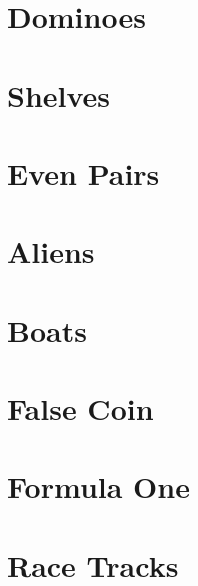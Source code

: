 \documentclass[a4paper, 10pt]{article}
\let\stdsection\section
\renewcommand\section{\newpage\stdsection}
\newcommand{\includecode}[1]{
    }
\newcommand{\algoAuthor}{2} %
\begin{document}
    \section{Dominoes}
        \label{sec:dominoes}
        \includecode{../problems/w01/Dominoes/Dominoes\algoAuthor.cpp}
    
    \section{Shelves}
        \label{sec:shelves}
        \includecode{../problems/w01/Shelves/Shelves\algoAuthor.cpp}
        
    \section{Even Pairs}
        \label{sec:even_pairs}
        \includecode{../problems/w01/Shelves/Shelves\algoAuthor.cpp}
    
    
    \section{Aliens}
        \label{sec:aliens}
        \includecode{../problems/w02/Aliens/Aliens\algoAuthor.cpp}
        
    \section{Boats}
        \label{sec:boats}
        \includecode{../problems/w02/Boats/Boats\algoAuthor.cpp}
        
    \section{False Coin}
        \label{sec:false_coin}
        \includecode{../problems/w02/False_Coin/FalseCoin\algoAuthor.cpp}
        
    \section{Formula One}
        \label{sec:formula_one}
        \includecode{../problems/w02/Formulas/Formulas\algoAuthor.cpp}
        
    \section{Race Tracks}
        \label{sec:race_tracks}
        \includecode{../problems/w02/Race_Tracks/RaceTracks\algoAuthor.cpp}
\end{document}
